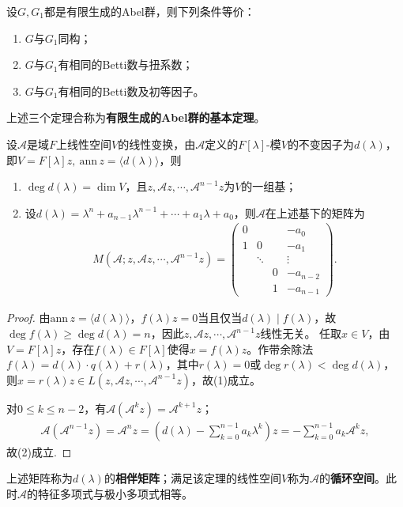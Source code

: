\documentclass[../../main.tex]{subfiles}%
\begin{document}
\begin{theorem}
设$G,G_1$都是有限生成的Abel群，则下列条件等价：
\begin{enumerate}[(1)]
\item $G$与$G_1$同构；
\item $G$与$G_1$有相同的Betti数与扭系数；
\item $G$与$G_1$有相同的Betti数及初等因子。
\end{enumerate}
\end{theorem}
\begin{remark}
上述三个定理合称为\textbf{有限生成的Abel群的基本定理}。
\end{remark}

\begin{theorem}
设$\mathscr{A}$是域$F$上线性空间$V$的线性变换，由$\mathscr{A}$定义的$F[\lambda]$-模$V$的不变因子为$d(\lambda)$，即$V=F[\lambda]z,\ \mathrm{ann}\,z=\langle d(\lambda)\rangle$，则
\begin{enumerate}[(1)]
\item $\deg d(\lambda)=\dim V$，且$z,\mathscr{A}z,\cdots,\mathscr{A}^{n-1}z$为$V$的一组基；
\item 设$d(\lambda)=\lambda^n+a_{n-1}\lambda^{n-1}+\cdots+a_1\lambda+a_0$，则$\mathscr{A}$在上述基下的矩阵为
\begin{align*}
M(\mathscr{A};z,\mathscr{A}z,\cdots,\mathscr{A}^{n-1}z)=
\begin{pmatrix}
0&&&-a_0\\
1&0&&-a_1\\
&\ddots&&\vdots\\
&&0&-a_{n-2}\\
&&1&-a_{n-1}
\end{pmatrix}.
\end{align*}
\end{enumerate}
\end{theorem}
\begin{proof}
由$\mathrm{ann}\,z=\langle d(\lambda)\rangle$，$f(\lambda)z=0$当且仅当$d(\lambda)\mid f(\lambda)$，故$\deg f(\lambda)\geqslant\deg d(\lambda)=n$，因此$z,\mathscr{A}z,\cdots,\mathscr{A}^{n-1}z$线性无关。
任取$x\in V$，由$V=F[\lambda]z$，存在$f(\lambda)\in F[\lambda]$使得$x=f(\lambda)z$。作带余除法$f(\lambda)=d(\lambda)\cdot q(\lambda)+r(\lambda)$，其中$r(\lambda)=0$或$\deg r(\lambda)<\deg d(\lambda)$，则$x=r(\lambda)z\in L(z,\mathscr{A}z,\cdots,\mathscr{A}^{n-1}z)$，故(1)成立。

对$0\leqslant k\leqslant n-2$，有$\mathscr{A}(\mathscr{A}^kz)=\mathscr{A}^{k+1}z$；
\begin{align*}
\mathscr{A}(\mathscr{A}^{n-1}z)=\mathscr{A}^nz=\left(d(\lambda)-\sum_{k=0}^{n-1}a_k\lambda^k\right)z=-\sum_{k=0}^{n-1}a_k\mathscr{A}^kz,
\end{align*}
故(2)成立.
\end{proof}
\begin{remark}
上述矩阵称为$d(\lambda)$的\textbf{相伴矩阵}；满足该定理的线性空间$V$称为$\mathscr{A}$的\textbf{循环空间}。此时$\mathscr{A}$的特征多项式与极小多项式相等。
\end{remark}
\end{document}
